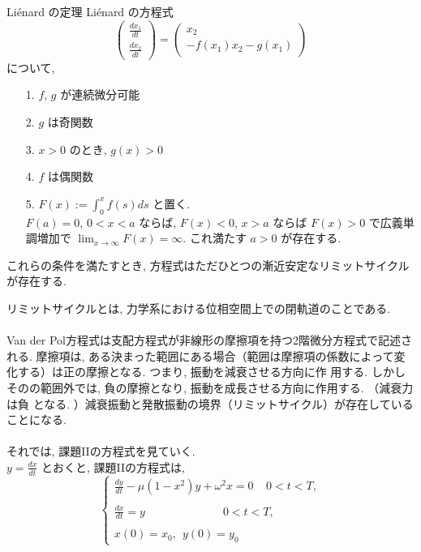 \documentclass[11pt]{jsarticle}
\begin{document}
\begin{itembox}[c]{Li\'{e}nard の定理}
Li\'{e}nard の方程式 \\
\[ \begin{pmatrix} \displaystyle \frac{dx_1}{dt} \\ \displaystyle \frac{dx_2}{dt} \end{pmatrix} = \begin{pmatrix} \displaystyle x_2 \\ \displaystyle -f(x_1)x_2 - g(x_1) \end{pmatrix}\]
について, 
\begin{itemize}
\item[1.] $f$, $g$ が連続微分可能
\item[2.] $g$ は奇関数
\item[3.] $x > 0$ のとき, $g(x) > 0$
\item[4.] $f$ は偶関数
\item[5.] $F(x) := \int_{0}^{x} f(s) ds$ と置く. \\
$F(a) = 0$, $0 < x < a$ ならば, $F(x) < 0$, $x > a$ ならば $F(x) > 0$ で広義単調増加で $\lim_{x \to \infty} F(x) = \infty$. これ満たす $a > 0$ が存在する. 
\end{itemize}
これらの条件を満たすとき, 方程式はただひとつの漸近安定なリミットサイクルが存在する. 
\end{itembox}
リミットサイクルとは, 力学系における位相空間上での閉軌道のことである. \\
\ \\
Van der Pol方程式は支配方程式が非線形の摩擦項を持つ2階微分方程式で記述される. 摩擦項は, ある決まった範囲にある場合（範囲は摩擦項の係数によって変化する）は正の摩擦となる. つまり, 振動を減衰させる方向に作
用する. しかしそのの範囲外では, 負の摩擦となり, 振動を成長させる方向に作用する. （減衰力は負
となる. ）減衰振動と発散振動の境界（リミットサイクル）が存在していることになる. 
\ \\
\ \\
それでは, 課題IIの方程式を見ていく. \\
$\displaystyle y = \frac{dx}{dt}$ とおくと, 課題IIの方程式は, 
\[
\left\{
\begin{array}{l}
\displaystyle \frac{dy}{dt} - \mu (1 - x^{2}) y + \omega^{2}x = 0 \ \ \ \ \ 0 < t < T, \\
\ \\
\displaystyle \frac{dx}{dt} = y\ \ \ \ \ \ \ \ \ \ \ \ \ \ \ \ \ \ \ \ \ \ \ \ \ \ \ \ \ \ \ 0 < t < T, \\
\ \\
\displaystyle x(0) = x_{0} ,\ \ y(0) = y_{0}
\end{array}
\right.
\]
\end{document}
